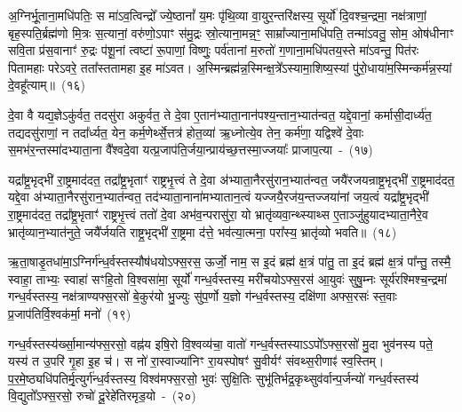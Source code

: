 अ॒ग्निर्भू॒ताना॒मधि॑पतिः॒ स मा॑ऽव॒त्विन्द्रो᳚ ज्ये॒ष्ठानां᳚ य॒मः पृ॑थि॒व्या वा॒युर॒न्तरि॑क्षस्य॒ सूर्यो॑ दि॒वश्च॒न्द्रमा॒ नक्ष॑त्राणां॒ बृह॒स्पति॒र्ब्रह्म॑णो मि॒त्रः स॒त्यानां॒ वरु॑णो॒\-ऽपाꣳ स॑मु॒द्रः स्रो॒त्याना॒मन्न॒ꣳ॒ साम्रा᳚ज्याना॒मधि॑पति॒ तन्मा॑ऽवतु॒ सोम॒ ओष॑धीनाꣳ सवि॒ता प्र॑स॒वानाꣳ॑ रु॒द्रः प॑शू॒नां त्वष्टा॑ रू॒पाणां॒ विष्णुः॒ पर्व॑तानां म॒रुतो॑ ग॒णाना॒मधि॑पतय॒स्ते मा॑ऽवन्तु॒ पित॑रः पितामहाः परे\-ऽवरे॒ तता᳚स्ततामहा इ॒ह मा॑ऽवत। अ॒स्मिन्ब्रह्म॑न्न॒स्मिन्क्ष॒त्रे᳚\-ऽस्यामा॒शिष्य॒स्यां पु॑रो॒धाया॑\-म॒स्मिन्कर्म॑न्न॒स्यां दे॒वहू᳚त्याम्॥~(१६)

{\anuvakamend[{अ॒व॒रे॒ स॒प्तद॑श च}]}%

दे॒वा वै यद्य॒ज्ञे\-ऽकु॑र्वत॒ तदसु॑रा अकुर्वत॒ ते दे॒वा ए॒तान॑भ्याता॒नान॑पश्य॒न्तान॒भ्यात॑न्वत॒ यद्दे॒वानां॒ कर्मासी॒दार्ध्य॑त॒ तद्यदसु॑राणां॒ न तदा᳚र्ध्यत॒ येन॒ कर्म॒णेर्थ्से॒त्तत्र॑ होत॒व्या॑ ऋ॒ध्नोत्ये॒व तेन॒ कर्म॑णा॒ यद्विश्वे॑ दे॒वाः स॒मभ॑र॒न्तस्मा॑दभ्याता॒ना वै᳚श्वदे॒वा यत्प्र॒जा\-प॑ति॒र्जया॒न्प्राय॑च्छ॒त्तस्मा॒ज्जयाः᳚ प्राजाप॒त्या~-~(१७)

यद्रा᳚ष्ट्र॒भृद्भी॑ रा॒ष्ट्रमाद॑दत॒ तद्रा᳚ष्ट्र॒भृताꣳ॑ राष्ट्रभृ॒त्त्वं ते दे॒वा अ॑भ्याता॒नैरसु॑रान॒भ्यात॑न्वत॒ जयै॑रजयन्राष्ट्र॒भृद्भी॑ रा॒ष्ट्रमाद॑दत॒ यद्दे॒वा अ॑भ्याता॒नैरसु॑रान॒भ्यात॑न्वत॒ तद॑भ्याता॒नाना॑मभ्यातान॒त्वं यज्जयै॒रज॑य॒न्तज्जया॑नां जय॒त्वं यद्रा᳚ष्ट्र॒भृद्भी॑ रा॒ष्ट्रमाद॑दत॒ तद्रा᳚ष्ट्र॒भृताꣳ॑ राष्ट्रभृ॒त्त्वं ततो॑ दे॒वा अभ॑व॒न्परासु॑रा॒ यो भ्रातृ॑व्यवा॒न्थ्स्याथ्स ए॒ताञ्जु॑हुयादभ्याता॒नैरे॒व भ्रातृ॑व्यान॒भ्यात॑नुते॒ जयै᳚र्जयति राष्ट्र॒भृद्भी॑ रा॒ष्ट्रमा द॑त्ते॒ भव॑त्या॒त्मना॒ परा᳚स्य॒ भ्रातृ॑व्यो भवति॥~(१८)

{\anuvakamend[{प्रा॒जा॒प॒त्याः सो᳚\-ऽष्टाद॑श च}]}%

ऋ॒ता॒षाडृ॒तधा॑मा॒\-ऽग्निर्ग॑न्ध॒र्वस्तस्यौष॑धयो\-ऽफ्स॒रस॒ ऊर्जो॒ नाम॒ स इ॒दं ब्रह्म॑ क्ष॒त्रं पा॑तु॒ ता इ॒दं ब्रह्म॑ क्ष॒त्रं पा᳚न्तु॒ तस्मै॒ स्वाहा॒ ताभ्यः॒ स्वाहा॑ सꣳहि॒तो वि॒श्वसा॑मा॒ सूर्यो॑ गन्ध॒र्वस्तस्य॒ मरी॑चयो\-ऽफ्स॒रस॑ आ॒युवः॑ सुषु॒म्नः सूर्य॑रश्मिश्च॒न्द्रमा॑ गन्ध॒र्वस्तस्य॒ नक्ष॑त्राण्यफ्स॒रसो॑ बे॒कुर॑यो भु॒ज्युः सु॑प॒र्णो य॒ज्ञो ग॑न्ध॒र्वस्तस्य॒ दक्षि॑णा अफ्स॒रसः॑ स्त॒वाः प्र॒जा\-प॑तिर्वि॒श्वक॑र्मा॒ मनो॑~(१९)

गन्ध॒र्वस्तस्य॑र्ख्सा॒मान्य॑फ्स॒रसो॒ वह्न॑य इषि॒रो वि॒श्वव्य॑चा॒ वातो॑ गन्ध॒र्वस्तस्या\-ऽऽपो᳚\-ऽफ्स॒रसो॑ मु॒दा भुव॑नस्य पते॒ यस्य॑ त उ॒परि॑ गृ॒हा इ॒ह च॑। स नो॑ रा॒स्वाज्या॑निꣳ रा॒यस्पोषꣳ॑ सु॒वीर्यꣳ॑ संवथ्स॒रीणाꣴ॑ स्व॒स्तिम्। प॒र॒मे॒ष्ठ्यधि॑पति\-र्मृ॒त्युर्ग॑न्ध॒र्वस्तस्य॒ विश्व॑मफ्स॒रसो॒ भुवः॑ सुक्षि॒तिः सुभू॑तिर्भद्र॒कृथ्सुव॑र्वान्प॒र्जन्यो॑ गन्ध॒र्वस्तस्य॑ वि॒द्युतो᳚\-ऽफ्स॒रसो॒ रुचो॑ दू॒रेहे॑तिरमृड॒यो~-~(२०)

